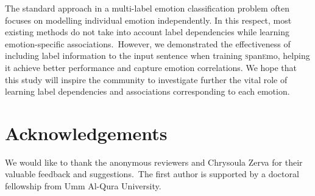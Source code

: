 \documentclass[11pt,a4paper]{article}
\begin{document}
The standard approach in a multi-label emotion classification problem often focuses on modelling individual emotion independently. In this respect, most existing methods do not take into account label dependencies while learning emotion-specific associations.~However, we demonstrated the effectiveness of including label information to the input sentence when training \textsc{s}pan\textsc{e}mo, helping it achieve better performance and capture emotion correlations. We hope that this study will inspire the community to investigate further the vital role of learning label dependencies and associations corresponding to each emotion.

\section*{Acknowledgements}
We would like to thank the anonymous reviewers and Chrysoula Zerva for their valuable feedback and suggestions.~The first author is supported by a doctoral fellowship from Umm Al-Qura University.


\end{document}
